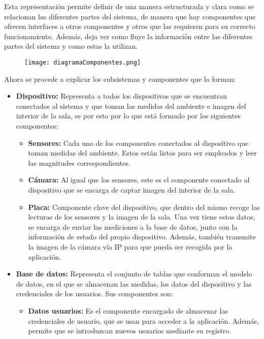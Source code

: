 Esta representación permite definir de una manera estructurada y clara como se relacionan las diferentes partes del sistema, de manera que hay componentes que ofrecen interfaces a otros componentes y otros que las requieren para su correcto funcionamiento. Además, deja ver como fluye la información entre las diferentes partes del sistema y como estas la utilizan.
\begin{figure}[H]
	{\texttt{[image: diagramaComponentes.png]}}
\end{figure}
Ahora se procede a explicar los subsistemas y componentes que lo forman:
\begin{itemize}
	\item \textbf{Dispositivo:} Representa a todos los dispositivos que se encuentran conectados al sistema y que toman las medidas del ambiente e imagen del interior de la sala, es por esto por lo que está formado por los siguientes componentes:
	      \begin{itemize}
		      \item \textbf{Sensores:} Cada uno de los componentes conectados al dispositivo que toman medidas del ambiente. Estos están listos para ser empleados y leer las magnitudes correspondientes.
		      \item \textbf{Cámara:} Al igual que los sensores, este es el componente conectado al dispositivo que se encarga de captar imagen del interior de la sala.
		      \item \textbf{Placa:} Componente clave del dispositivo, que dentro del mismo recoge las lecturas de los sensores y la imagen de la sala. Una vez tiene estos datos, se encarga de enviar las mediciones a la base de datos, junto con la información de estado del propio dispositivo. Además, también transmite la imagen de la cámara vía IP para que pueda ser recogida por la aplicación.
	      \end{itemize}
	\item \textbf{Base de datos:} Representa el conjunto de tablas que conforman el modelo de datos, en el que se almacenan las medidas, los datos del dispositivo y las credenciales de los usuarios. Sus componentes son:
	      \begin{itemize}
		      \item \textbf{Datos usuarios:} Es el componente encargado de almacenar las credenciales de usuario, que se usan para acceder a la aplicación. Además, permite que se introduzcan nuevos usuarios mediante su registro.

\end{itemize}
\end{itemize}
